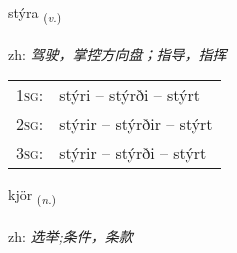 \documentclass[frontgrid, backgrid]{flacards}\usepackage[]{graphicx}\usepackage[]{color}
\begin{document}
\renewcommand{\flhead}{\vskip5pt \fboxsep=0pt {\small\bfseries\footnotesize Sagnorð | 动词}}
\renewcommand{\fcfoot}{\vskip5pt \fboxsep=0pt \hspace{2pt}{\small\bfseries\footnotesize 2K}}

\renewcommand{\blhead}{\vskip5pt {\small\bfseries\footnotesize Sagnorð | 动词 }}
\renewcommand{\bcfoot}{\vskip5pt \hspace{2pt}{\small\bfseries\footnotesize 2K}}


{stýra \small{\textsubscript{(\textit{v.})}} \\[1ex] %
\textphonetic{[stiːra]} \\
zh: \emph{驾驶，掌控方向盘；指导，指挥} \\  [2ex]
\renewcommand*{\arraystretch}{0.8}
\begin{tabular}{p{1cm}l}
\textsc{1sg}: & stýri -- stýrði -- stýrt \\ 
\textsc{2sg}: & stýrir -- stýrðir -- stýrt \\ 
\textsc{3sg}: & stýrir -- stýrði -- stýrt \\ 
\end{tabular}
}

\renewcommand{\flhead}{\vskip5pt \fboxsep=0pt {\small\bfseries\footnotesize Nafnorð | 名词}}
\renewcommand{\fcfoot}{\vskip5pt \fboxsep=0pt \hspace{2pt}{\small\bfseries\footnotesize 2K}}

\renewcommand{\blhead}{\vskip5pt {\small\bfseries\footnotesize Nafnorð | 名词 }}
\renewcommand{\bcfoot}{\vskip5pt \hspace{2pt}{\small\bfseries\footnotesize 2K}}


{kjör \small{\textsubscript{(\textit{n.})}} \\[1ex] %
\textphonetic{[cʰœːr]} \\
zh: \emph{选举;条件，条款} \\  [2ex]
\renewcommand*{\arraystretch}{0.8}
}
\end{document}

